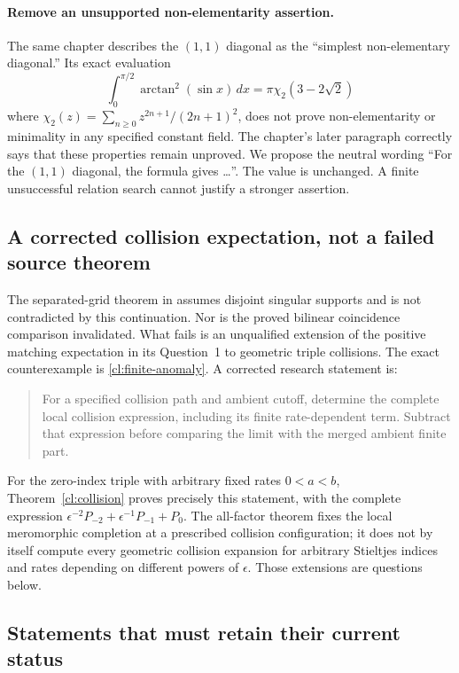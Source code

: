 \paragraph{Remove an unsupported non-elementarity assertion.}
The same chapter describes the $(1,1)$ diagonal as the
``simplest non-elementary diagonal.'' Its exact evaluation
\[
 \int_0^{\pi/2}\arctan^2(\sin x)\,dx
       =\pi\chi_2(3-2\sqrt2)
\]
where $\chi_2(z)=\sum_{n\ge0}z^{2n+1}/(2n+1)^2$,
does not prove non-elementarity or minimality in any specified
constant field. The chapter's later paragraph correctly says that
these properties remain unproved. We propose the neutral wording
``For the $(1,1)$ diagonal, the formula gives \dots''.
The value is unchanged. A finite unsuccessful relation search
cannot justify a stronger assertion.

\subsection{A corrected collision expectation, not a failed source theorem}

The separated-grid theorem in \cite{RepoExact} assumes disjoint
singular supports and is not contradicted by this continuation.
Nor is the proved bilinear coincidence comparison invalidated.
What fails is an unqualified extension of the positive matching
expectation in its Question~1 to geometric triple collisions.
The exact counterexample is \eqref{cl:finite-anomaly}.
A corrected research statement is:

\begin{quote}
For a specified collision path and ambient cutoff, determine the
complete local collision expression, including its finite
rate-dependent term. Subtract that expression before comparing
the limit with the merged ambient finite part.
\end{quote}

For the zero-index triple with arbitrary fixed rates $0<a<b$,
Theorem~\ref{cl:collision} proves precisely this statement, with
the complete expression
$\epsilon^{-2}P_{-2}+\epsilon^{-1}P_{-1}+P_0$.
The all-factor theorem fixes the local meromorphic completion at
a prescribed collision configuration; it does not by itself
compute every geometric collision expansion for arbitrary
Stieltjes indices and rates depending on different powers of
$\epsilon$. Those extensions are questions below.

\subsection{Statements that must retain their current status}


